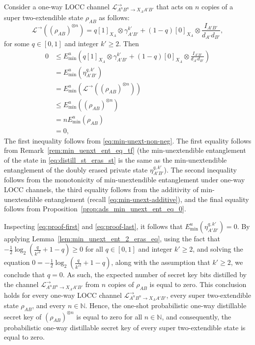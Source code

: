\documentclass[twocolumn,letterpaper, dvipsnames,allowtoday, accepted = 2025-12-31]{quantumarticle}
\begin{document}
       Consider a one-way LOCC channel $\mathcal{L}^{\to}_{A^nB^n\to X_AA'B'}$ that acts on $n$ copies of a super two-extendible state $\rho_{AB}$ as follows:
    \begin{equation}\label{eq:distill_st_eras_st}
        \mathcal{L}^{\to}\!\left(\left(\rho_{AB}\right)^{\otimes n}\right) = q[1]_{X_A}\otimes \gamma^{k'}_{A'B'} + (1-q)[0]_{X_A}\otimes \frac{I_{A'B'}}{d_{A'}d_{B'}},
    \end{equation}
    for some  $q\in [0,1]$ and integer $k'\geq 2$. Then 
    \begin{align}
        \label{eq:proof-first} 0 & \leq 
        E^u_{\min}\!\left(q[1]_{X_A}\otimes \gamma^{k'}_{A'B'} + (1-q)[0]_{X_A}\otimes \frac{I_{A'B'}}{d_{A'}d_{B'}}\right) \\
        & = E^u_{\min}\!\left(\eta^{q,k'}_{A'B'}\right) \\
        &= E^u_{\min}\!\left(\mathcal{L}^{\to}\!\left(\left(\rho_{AB}\right)^{\otimes n}\right)\right) \\
        &\le E^u_{\min}\!\left(\left(\rho_{AB}\right)^{\otimes n}\right)\\
        &= nE^u_{\min}\!\left(\rho_{AB}\right)\\
        &= 0,
        \label{eq:proof-last} 
    \end{align}
    The first inequality follows from \eqref{eq:min-unext-non-neg}. 
    The first equality follows from  Remark~\ref{rem:min_uenxt_ent_eq_tf} (the min-unextendible entanglement of the state in \eqref{eq:distill_st_eras_st} is the same as the min-unextendible entanglement of the doubly erased private state $\eta^{q,k'}_{A'B'}$).
    The second inequality follows from the monotonicity of min-unextendible entanglement under one-way LOCC channels, the third equality follows from the additivity of min-unextendible entanglement (recall \eqref{eq:min-unext-additive}), and the final equality follows from Proposition~\ref{prop:ads_min_unext_ent_eq_0}.
    
    Inspecting \eqref{eq:proof-first} and \eqref{eq:proof-last}, it follows that $E^u_{\min}\!\left(\eta^{q,k'}_{A'B'}\right) = 0$. By applying Lemma~\ref{lem:min_unext_ent_2_eras_eq}, using the fact that $-\frac{1}{2}\log_2\!\left(\frac{q}{k'^2} + 1-q\right) \geq 0$ for all $q \in [0,1]$ and integer $k' \geq 2$, and solving the equation $0 = -\frac{1}{2}\log_2\!\left(\frac{q}{k'^2} + 1-q\right)$, along with the assumption that $k' \geq 2$, we conclude that $q = 0$. As such, the expected number of secret key bits distilled by the channel $\mathcal{L}^{\to}_{A^nB^n\to X_AA'B'}$ from $n$ copies of $\rho_{AB}$ is equal to zero. This conclusion  holds for every one-way LOCC channel $\mathcal{L}^{\to}_{A^nB^n\to X_AA'B'}$, every super two-extendible state $\rho_{AB}$, and every $n\in \mathbb{N}$. Hence, the one-shot probabilistic one-way distillable secret key of $\left(\rho_{AB}\right)^{\otimes n}$ is equal to zero for all $n\in \mathbb{N}$, and consequently, the probabilistic one-way distillable secret key of every super two-extendible state is equal to zero.
\end{document}

